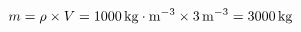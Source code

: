 \[
    m = \rho \times V 
      = 1000 \, \mathrm{kg \cdot m^{-3}} 
      \times 3 \, \mathrm{m^{-3}} 
      = 3000 \, \mathrm{kg}
\]
